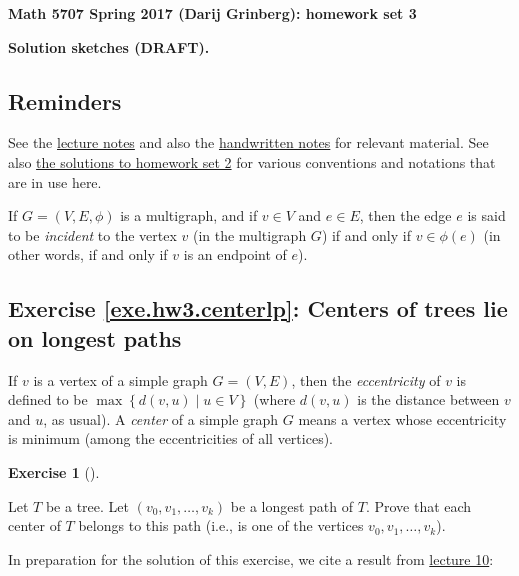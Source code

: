 \documentclass[numbers=enddot,12pt,final,onecolumn,notitlepage]{scrartcl}%
\newcounter{exer}
\theoremstyle{definition}
\newtheorem{exmp}[exer]{Exercise}
\newenvironment{exercise}[1][]
{\begin{exmp}[#1]\begin{leftbar}}
{\end{leftbar}\end{exmp}}
\newcommand{\set}[1]{\left\{ #1 \right\}}
\newcommand{\tup}[1]{\left( #1 \right)}
\begin{document}
\begin{center}
\textbf{Math 5707 Spring 2017 (Darij Grinberg): homework set 3}

\textbf{Solution sketches (DRAFT).}
\end{center}

\tableofcontents

\subsection{Reminders}

See the
\href{http://www.cip.ifi.lmu.de/~grinberg/t/17s/nogra.pdf}{lecture notes}
and also the
\href{http://www.cip.ifi.lmu.de/~grinberg/t/17s/}{handwritten notes}
for relevant material.
See also
\href{http://www.cip.ifi.lmu.de/~grinberg/t/17s/hw2s.pdf}{the solutions to homework set 2}
for various conventions and notations that are in use here.

If $G = \tup{V, E, \phi}$ is a multigraph, and if $v \in V$ and
$e \in E$, then the edge $e$ is said to be \textit{incident} to
the vertex $v$ (in the multigraph $G$) if and only if
$v \in \phi\tup{e}$ (in other words, if and only if $v$ is an
endpoint of $e$).

\subsection{Exercise \ref{exe.hw3.centerlp}: Centers of trees lie on
longest paths}

If $v$ is a vertex of a simple graph $G = \tup{V, E}$, then the
\textit{eccentricity} of $v$ is defined to be
$\max \set{ d\tup{v, u} \mid u \in V }$ (where $d\tup{v, u}$ is the
distance between $v$ and $u$, as usual). A \textit{center} of a simple
graph $G$ means a vertex whose eccentricity is minimum (among the
eccentricities of all vertices).

\begin{exercise} \label{exe.hw3.centerlp}
Let $T$ be a tree. Let $\tup{v_0, v_1, \ldots, v_k}$ be a longest path
of $T$. Prove that each center of $T$ belongs to this path (i.e., is
one of the vertices $v_0, v_1, \ldots, v_k$).
\end{exercise}

In preparation for the solution of this exercise, we cite a result
from
\href{http://www.cip.ifi.lmu.de/~grinberg/t/17s/5707lec10.pdf}{lecture 10}:
\end{document}
